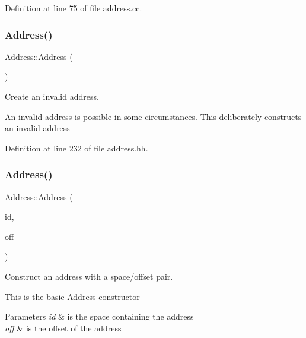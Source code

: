 Definition at line 75 of file address.\+cc.

\mbox{\label{class_address_a69a01db36be374e934ed33c773e31b7f}} 
\subsubsection{\texorpdfstring{Address()}{Address()}\hspace{0.1cm}{\footnotesize\ttfamily [2/4]}}
{\footnotesize\ttfamily Address\+::\+Address (\begin{DoxyParamCaption}\item[{void}]{ }\end{DoxyParamCaption})\hspace{0.3cm}{\ttfamily [inline]}}



Create an invalid address. 

An invalid address is possible in some circumstances. This deliberately constructs an invalid address 

Definition at line 232 of file address.\+hh.

\mbox{\label{class_address_aa525e3d0433b8bbe9045465d78cfe5ae}} 
\subsubsection{\texorpdfstring{Address()}{Address()}\hspace{0.1cm}{\footnotesize\ttfamily [3/4]}}
{\footnotesize\ttfamily Address\+::\+Address (\begin{DoxyParamCaption}\item[{\mbox{\hyperlink{class_addr_space}{Addr\+Space}} $\ast$}]{id,  }\item[{\mbox{\hyperlink{types_8h_a2db313c5d32a12b01d26ac9b3bca178f}{uintb}}}]{off }\end{DoxyParamCaption})\hspace{0.3cm}{\ttfamily [inline]}}



Construct an address with a space/offset pair. 

This is the basic \mbox{\hyperlink{class_address}{Address}} constructor 
\begin{DoxyParams}{Parameters}
{\em id} & is the space containing the address \\
\hline
{\em off} & is the offset of the address \\
\hline
\end{DoxyParams}


